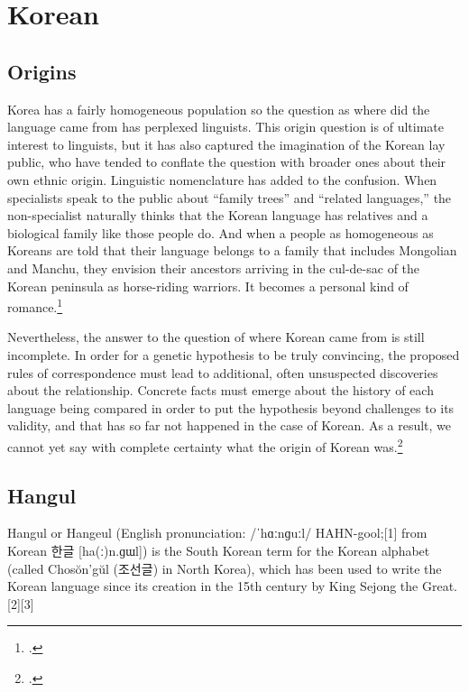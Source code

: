 \newfontfamily{}

\def\textko#1{\bgroup\korean #1\egroup}

\chapter{Korean}

\section{Origins}

Korea has a fairly homogeneous population so the question as where did the language came from has perplexed linguists. 
This origin question is of ultimate interest to linguists, but it has also captured the imagination of the
Korean lay public, who have tended to conflate the question with broader ones about their own ethnic origin. Linguistic nomenclature has added to the confusion. When specialists speak to the public about \enquote{family trees} and
\enquote{related languages,} the non-specialist naturally thinks that the Korean language
has relatives and a biological family like those people do. And when
a people as homogeneous as Koreans are told that their language belongs to a
family that includes Mongolian and Manchu, they envision their ancestors
arriving in the cul-de-sac of the Korean peninsula as horse-riding warriors.
It becomes a personal kind of romance.\footcite{ki-moon2011}

Nevertheless, the answer to the question of where Korean came from is
still incomplete. In order for a genetic hypothesis to be truly convincing, the
proposed rules of correspondence must lead to additional, often unsuspected
discoveries about the relationship. Concrete facts must emerge about the
history of each language being compared in order to put the hypothesis
beyond challenges to its validity, and that has so far not happened in the case
of Korean. As a result, we cannot yet say with complete certainty what the
origin of Korean was.\footcite{ki-moon2011}



\section{Hangul}
Hangul or Hangeul (English pronunciation: /ˈhɑːnɡuːl/ HAHN-gool;[1] from Korean {\korean 한글} [ha(ː)n.ɡɯl]) is the South Korean term for the Korean alphabet (called Chosŏn'gŭl ({\korean 조선글}) in North Korea), which has been used to write the Korean language since its creation in the 15th century by King Sejong the Great.[2][3]

